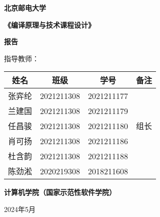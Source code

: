 \documentclass[12pt, a4paper, oneside]{ctexart}
\begin{document}
\begin{titlepage}
\begin{center}
    \Huge{\textbf{北\quad 京\quad 邮\quad 电\quad 大\quad 学}}

    \vspace{2em}
    
    \Large{\textbf{《编译原理与技术课程设计》}}
    
    \Large{\textbf{报\qquad 告}}

    \vspace{4em}

    \large{指导教师： \underline{}}
\end{center}

\vspace{6em}

\begin{table}[h]
    \centering
    \begin{tabular}{|c|c|c|c|}
        \hline
        \textbf{姓名} & \textbf{班级} & \textbf{学号} & \textbf{备注} \\
        \hline
        张弈纶 & 2021211308 & 2021211177 & \\
        \hline
        兰建国 & 2021211308 & 2021211179 & \\
        \hline
        任昌骏 & 2021211308 & 2021211180 & 组长 \\
        \hline
        肖可扬 & 2021211308 & 2021211186 & \\
        \hline
        杜含韵 & 2021211308 & 2021211188 & \\
        \hline
        陈劲淞 & 2020219308 & 2018211608 & \\
        \hline
    \end{tabular}
\end{table}

\vspace{8em}

\begin{center}
    \Large{\textbf{计算机学院（国家示范性软件学院）}}

    \Large{2024年5月}
\end{center}
\end{titlepage}

\clearpage

\setcounter{page}{1}
\tableofcontents

\clearpage
\setcounter{page}{1}
\end{document}
